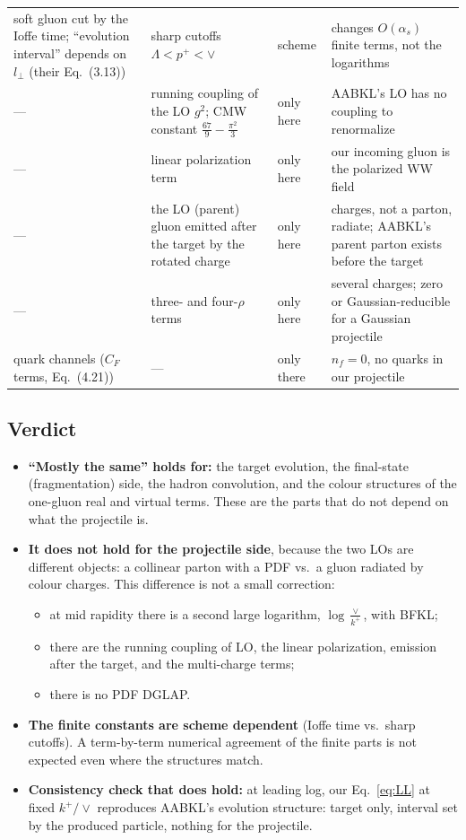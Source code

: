 \documentclass[11pt]{article}
\numberwithin{equation}{section}
\begin{document}
{\begin{longtable}{@{}>{\raggedright\arraybackslash}p{}>{\raggedright\arraybackslash}p{}>{\raggedright\arraybackslash}p{}>{\raggedright\arraybackslash}p{}@{}}
soft gluon cut by the Ioffe time; ``evolution interval'' depends on $l_\perp$ (their Eq.~(3.13)) & sharp cutoffs $\Lambda<p^+<\vee$ & scheme & changes $O(\alpha_s)$ finite terms, not the logarithms\\
--- & running coupling of the LO $g^2$; CMW constant $\frac{67}{9}-\frac{\pi^2}{3}$ & only here & AABKL's LO has no coupling to renormalize\\
--- & linear polarization term & only here & our incoming gluon is the polarized WW field\\
--- & the LO (parent) gluon emitted after the target by the rotated charge & only here & charges, not a parton, radiate; AABKL's parent parton exists before the target\\
--- & three- and four-$\rho$ terms & only here & several charges; zero or Gaussian-reducible for a Gaussian projectile\\
quark channels ($C_F$ terms, Eq.~(4.21)) & --- & only there & $n_f=0$, no quarks in our projectile\\\bottomrule
\end{longtable}}

\subsection{Verdict}
\begin{itemize}
\item \textbf{``Mostly the same'' holds for:} the target evolution, the final-state (fragmentation) side, the hadron convolution, and the colour structures of the one-gluon real and virtual terms. These are the parts that do not depend on what the projectile is.
\item \textbf{It does not hold for the projectile side}, because the two LOs are different objects: a collinear parton with a PDF vs.\ a gluon radiated by colour charges. This difference is not a small correction:
\begin{itemize}
\item at mid rapidity there is a second large logarithm, $\log\frac{\vee}{k^+}$, with BFKL;
\item there are the running coupling of LO, the linear polarization, emission after the target, and the multi-charge terms;
\item there is no PDF DGLAP.
\end{itemize}
\item \textbf{The finite constants are scheme dependent} (Ioffe time vs.\ sharp cutoffs). A term-by-term numerical agreement of the finite parts is not expected even where the structures match.
\item \textbf{Consistency check that does hold:} at leading log, our Eq.~\eqref{eq:LL} at fixed $k^+/\vee$ reproduces AABKL's evolution structure: target only, interval set by the produced particle, nothing for the projectile.
\end{itemize}
\end{document}

